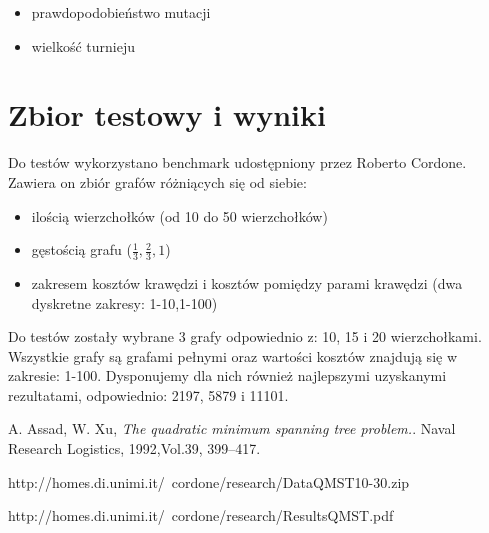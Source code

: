 \documentclass[12pt]{article}
\newcounter{lastnote}
\begin{document}
\begin{itemize}
  \item prawdopodobieństwo mutacji
  \item wielkość turnieju
\end{itemize}




 \section{Zbior testowy i wyniki}


 Do testów wykorzystano benchmark udostępniony przez Roberto Cordone\cite{Bechmark}. Zawiera on zbiór grafów różniących się od siebie:
 
 \begin{itemize}
  \item ilością wierzchołków (od 10 do 50 wierzchołków)
  \item gęstością grafu ($\frac{1}{3}, \frac{2}{3}, 1$)
  \item zakresem kosztów krawędzi i kosztów pomiędzy parami krawędzi (dwa dyskretne zakresy: 1-10,1-100)
\end{itemize}

Do testów zostały wybrane 3 grafy odpowiednio z: 10, 15 i 20 wierzchołkami. Wszystkie grafy są grafami pełnymi oraz wartości kosztów znajdują się w zakresie: 1-100. Dysponujemy dla nich również najlepszymi uzyskanymi rezultatami, odpowiednio: 2197, 5879 i 11101\cite{Results}.




\begin{thebibliography}{9}

  A. Assad, W. Xu,
  \emph{The quadratic minimum spanning tree problem.}.
  Naval Research Logistics, 1992,Vol.39, 399–417.
  
  http://homes.di.unimi.it/~cordone/research/DataQMST10-30.zip
  
  
  http://homes.di.unimi.it/~cordone/research/ResultsQMST.pdf


\end{thebibliography}




\clearpage
\end{document}
